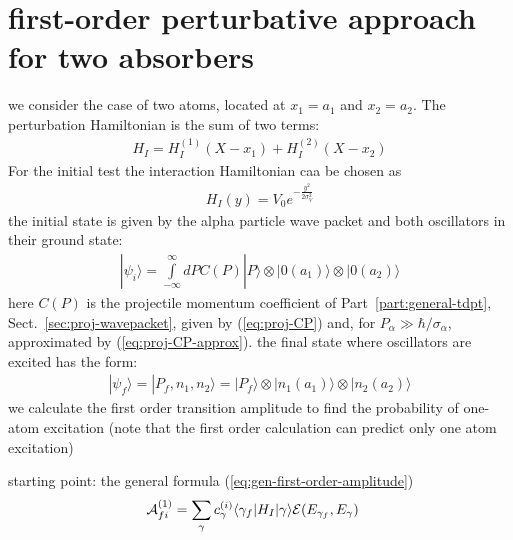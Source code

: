 \newpage
\section{first-order perturbative approach for two absorbers}\label{sec:osc-two-absorber-o1}

we consider the case of two atoms, located at $x_1=a_1$ and $x_2=a_2$. The perturbation Hamiltonian is the sum of two terms:
\begin{align}
  H_I = H_I^{(1)}(X-x_1) +H_I^{(2)}(X-x_2)
\end{align}
For the initial test the interaction Hamiltonian caa be chosen as
\begin{align}
  H_I(y)=V_0 e^{-\frac{y^2}{2\sigma_V^2}}
\end{align}
the initial state is given by the alpha particle wave packet and both oscillators in their ground state:
\begin{align}
  |\psi_i\rangle = \int\limits_{-\infty}^{\infty}dP C(P)|P\rangle\otimes|0(a_1)\rangle\otimes|0(a_2)\rangle
\end{align}
here $C(P)$ is the projectile momentum coefficient of Part~\ref{part:general-tdpt}, Sect.~\ref{sec:proj-wavepacket}, given by (\ref{eq:proj-CP}) and, for $P_\alpha\gg\hbar/\sigma_\alpha$, approximated by (\ref{eq:proj-CP-approx}).
the final state where  oscillators are excited has the form:
\begin{align}
  |\psi_f\rangle = |P_f, n_1, n_2\rangle = |P_f\rangle\otimes|n_1(a_1)\rangle\otimes|n_2(a_2)\rangle
\end{align}
we calculate the first order transition amplitude to find the probability of one-atom excitation (note that the first order calculation can predict only one atom excitation)

starting point: the general formula (\ref{eq:gen-first-order-amplitude})
\begin{align}
  {\cal A}_{fi}^{(1)} & =\sum_\gamma {c_\gamma^{(i)}} \langle \gamma_f|H_I|\gamma\rangle  {\cal E}(E_{\gamma_f},E_\gamma)\label{eq:osc-first-order-amplitude-restated}
\end{align}

